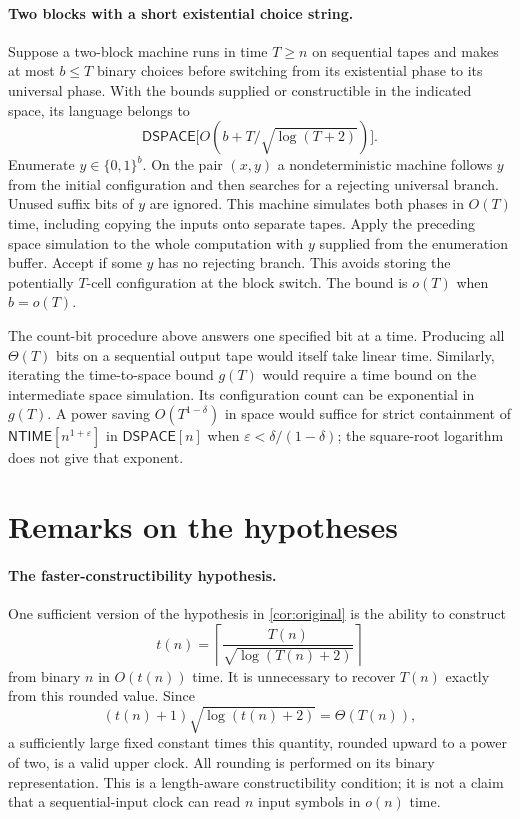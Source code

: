 \documentclass[11pt]{article}
\theoremstyle{definition}
\theoremstyle{remark}
\newcommand{\NTIME}{\mathsf{NTIME}}
\begin{document}
\paragraph{Two blocks with a short existential choice string.}
Suppose a two-block machine runs in time $T\ge n$ on sequential tapes
and makes at most $b\le T$ binary choices before switching from its
existential phase to its universal phase. With the bounds supplied
or constructible in the indicated space, its language belongs to
\[
  \mathsf{DSPACE}\big[O(b+T/\sqrt{\log(T+2)})\big].
\]
Enumerate $y\in\{0,1\}^b$. On the pair $(x,y)$ a nondeterministic
machine follows $y$ from the initial configuration and then searches
for a rejecting universal branch. Unused suffix bits of $y$ are
ignored. This machine simulates both phases in $O(T)$ time, including
copying the inputs onto separate tapes. Apply the preceding space
simulation to the whole computation with $y$ supplied from the
enumeration buffer. Accept if some $y$ has no rejecting branch.
This avoids storing the potentially $T$-cell configuration at the
block switch. The bound is $o(T)$ when $b=o(T)$.

The count-bit procedure above answers one specified bit at a time.
Producing all $\Theta(T)$ bits on a sequential output tape would
itself take linear time. Similarly, iterating the time-to-space bound
$g(T)$ would require a time bound on the intermediate space
simulation. Its configuration count can be exponential in $g(T)$.
A power saving $O(T^{1-\delta})$ in space would suffice for strict
containment of $\NTIME[n^{1+\varepsilon}]$ in $\mathsf{DSPACE}[n]$
when $\varepsilon<\delta/(1-\delta)$; the square-root logarithm
does not give that exponent.

\section{Remarks on the hypotheses}\label{sec:remarks}

\paragraph{The faster-constructibility hypothesis.}
One sufficient version of the hypothesis in \cref{cor:original} is the ability to construct
\[
 t(n)=\left\lceil\frac{T(n)}{\sqrt{\log(T(n)+2)}}\right\rceil
\]
from binary $n$ in $O(t(n))$ time. It is unnecessary to recover $T(n)$ exactly from this rounded value. Since
\[
 (t(n)+1)\sqrt{\log(t(n)+2)}=\Theta(T(n)),
\]
a sufficiently large fixed constant times this quantity, rounded upward to a power of two, is a valid upper clock. All rounding is performed on its binary representation. This is a length-aware constructibility condition; it is not a claim that a sequential-input clock can read $n$ input symbols in $o(n)$ time.
\end{document}
